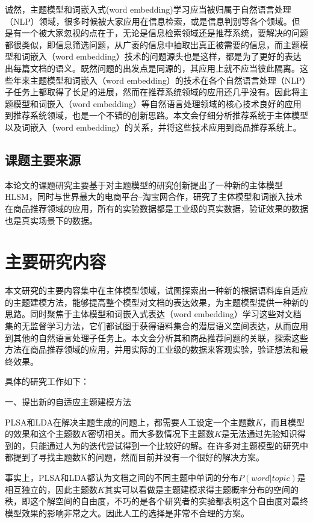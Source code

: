 诚然，主题模型和词嵌入式(word embedding)学习应当被归属于自然语言处理（NLP）领域，很多时候被大家应用在信息检索\cite{IR}，或是信息判别等各个领域。但是有一个被大家忽视的点在于，无论是信息检索领域还是推荐系统，要解决的问题都很类似，即信息筛选问题，从广袤的信息中抽取出真正被需要的信息，而主题模型和词嵌入（word embedding）技术的问题源头也是这样，都是为了更好的表达出每篇文档的语义。既然问题的出发点是同源的，其应用上就不应当彼此隔离。这些年来主题模型和词嵌入（word embedding）的技术在各个自然语言处理（NLP）子任务上都取得了长足的进展，然而在推荐系统领域的应用还几乎没有。因此将主题模型和词嵌入（word embedding）等自然语言处理领域的核心技术良好的应用到推荐系统领域，也是一个不错的创新思路。本文会仔细分析推荐系统于主体模型以及词嵌入（word embedding）的关系，并将这些技术应用到商品推荐系统上。

\subsection{课题主要来源}
本论文的课题研究主要基于对主题模型的研究创新提出了一种新的主体模型HLSM，同时与世界最大的电商平台--淘宝网合作，研究了主体模型和词嵌入技术在商品推荐领域的应用，所有的实验数据都是工业级的真实数据，验证效果的数据也是真实场景下的数据。
\section{主要研究内容}
本文研究的主要内容集中在主体模型领域，试图探索出一种新的根据语料库自适应的主题建模方法，能够提高整个模型对文档的表达效果，为主题模型提供一种新的思路。同时聚焦于主体模型和词嵌入式表达（word embedding）学习这些对文档集的无监督学习方法，它们都试图于获得语料集合的潜层语义空间表达，从而应用到其他的自然语言处理子任务上。本文会分析其和商品推荐问题的关联，探索这些方法在商品推荐领域的应用，并用实际的工业级的数据来客观实验，验证想法和最终效果。

具体的研究工作如下：

一、提出新的自适应主题建模方法

PLSA和LDA在解决主题生成的问题上，都需要人工设定一个主题数$K$，而且模型的效果和这个主题数$K$密切相关。而大多数情况下主题数$K$是无法通过先验知识得到的，只能通过人为的迭代尝试得到一个比较好的解。在许多对主题模型的研究中都提到了寻找主题数K的问题，然而目前并没有一个很好的解决方案。

事实上，PLSA和LDA都认为文档之间的不同主题中单词的分布$P(word|topic)$是相互独立的，因此主题数$K$其实可以看做是主题建模求得主题概率分布的空间的秩，即这个解空间的自由度，不巧的是各个研究者的实验都表明这个自由度对最终模型效果的影响非常之大。因此人工的选择是非常不合理的方案。

